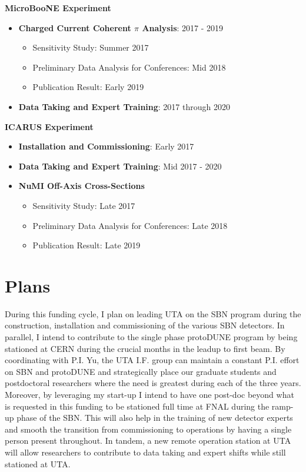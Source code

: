 \noindent\textbf{MicroBooNE Experiment}
\begin{itemize}[noitemsep,nolistsep]
\item{\textbf{Charged Current Coherent $\pi$ Analysis}}: 2017 - 2019
\begin{itemize}[noitemsep,nolistsep]
\item{Sensitivity Study: Summer 2017}
\item{Preliminary Data Analysis for Conferences: Mid 2018}
\item{Publication Result: Early 2019}
\end{itemize}

\item{\textbf{Data Taking and Expert Training}}: 2017 through 2020

\end{itemize}


\noindent\textbf{ICARUS Experiment}

\begin{itemize}[noitemsep,nolistsep]
\item{\textbf{Installation and Commissioning}}: Early 2017
\item{\textbf{Data Taking and Expert Training}}: Mid 2017 - 2020
\item{\textbf{NuMI Off-Axis Cross-Sections}}
\begin{itemize}[noitemsep,nolistsep]
\item{Sensitivity Study: Late 2017}
\item{Preliminary Data Analysis for Conferences: Late 2018}
\item{Publication Result: Late 2019}
\end{itemize}

\end{itemize}

\section*{\textbf{Plans}}
During this funding cycle, I plan on leading UTA on the SBN program during the construction, installation and commissioning of the various SBN detectors. In parallel, I intend to contribute to the single phase protoDUNE program by being stationed at CERN during the crucial months in the leadup to first beam. By coordinating with P.I. Yu, the UTA I.F. group can maintain a constant P.I. effort on SBN and protoDUNE and strategically place our graduate students and postdoctoral researchers where the need is greatest during each of the three years. Moreover, by leveraging my start-up I intend to have one post-doc beyond what is requested in this funding to be stationed full time at FNAL during the ramp-up phase of the SBN. This will also help in the training of new detector experts and smooth the transition from commissioning to operations by having a single person present throughout. In tandem, a new remote operation station at UTA will allow researchers to contribute to data taking and expert shifts while still stationed at UTA. 

